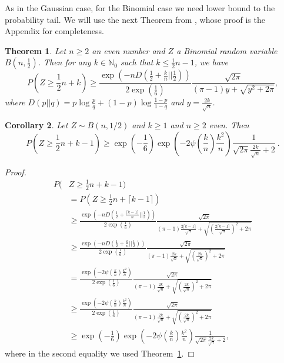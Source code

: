 \documentclass{article}
\newcommand{\field}[1]{\mathbb{#1}}
\newcommand{\Nat}{\field{N}}
\newtheorem{theorem}{Theorem}
\newtheorem{corrollary}[theorem]{Corollary}
\begin{document}
As in the Gaussian case, for the Binomial case we need lower bound to the probability tail.
We will use the next Theorem from \cite{nOrabona13}, whose proof is the Appendix for completeness.

\begin{theorem}
\label{lemma:bin}
Let $n\geq2$ an even number and $Z$ a Binomial random variable $B(n,\frac{1}{2})$. Then for any $k \in \Nat_0$ such that $k\leq \frac{1}{2}n-1$, we have
\[
P\left( Z \geq \frac{1}{2} n + k\right)
\geq  \frac{\exp\left(-n D(\frac{1}{2}+\frac{k}{n}||\frac{1}{2})\right)}{2 \exp\left(\frac{1}{6}\right)} \frac{\sqrt{2 \pi}}{(\pi-1)y+\sqrt{y^2+2 \pi}},
\]
where $D(p||q)=p \log \frac{p}{q}+(1-p) \log\frac{1-p}{1-q}$ and $y=\frac{2 k}{\sqrt{n}}$.
\end{theorem}
%
\begin{corrollary}
Let $Z \sim B(n, 1/2)$ and $k \geq 1$ and $n\geq2$ even. Then
\[
P(Z \geq \frac{1}{2} n + k-1) \geq \exp\left(-\frac{1}{6}\right) \exp\left(- 2 \psi\left(\frac{k}{n}\right) \frac{k^2}{n} \right) \frac{1}{\sqrt{2\pi} \frac{2 k}{\sqrt{n}} + 2 }~.
\]
\end{corrollary}
\begin{proof}
\begin{align*}
P(&Z \geq  \frac{1}{2} n + k-1) \\
& = P(Z\geq \frac{1}{2} n + \lceil k -1\rceil) \\
& \geq \frac{\exp\left(-n D(\frac{1}{2}+\frac{\lceil k -1\rceil}{n}||\frac{1}{2})\right)}{2 \exp\left(\frac{1}{6}\right)} \frac{\sqrt{2 \pi}}{(\pi-1)\frac{2\lceil k -1\rceil}{\sqrt{n}}+\sqrt{\left(\frac{2\lceil k -1\rceil}{\sqrt{n}}\right)^2+2 \pi}} \\
& \geq \frac{\exp\left(-n D(\frac{1}{2}+\frac{k}{n}||\frac{1}{2})\right)}{2 \exp\left(\frac{1}{6}\right)} \frac{\sqrt{2 \pi}}{(\pi-1)\frac{2k}{\sqrt{n}}+\sqrt{\left(\frac{2k}{\sqrt{n}}\right)^2+2 \pi}} \\
& = \frac{\exp\left(- 2 \psi(\frac{k}{n}) \frac{k^2}{n} \right)}{2 \exp\left(\frac{1}{6}\right)} \frac{\sqrt{2 \pi}}{(\pi-1)\frac{2k}{\sqrt{n}}+\sqrt{\left(\frac{2k}{\sqrt{n}}\right)^2+2 \pi}} \\
& \geq \frac{\exp\left(- 2 \psi(\frac{k}{n}) \frac{k^2}{n} \right)}{2 \exp\left(\frac{1}{6}\right)} \frac{\sqrt{2 \pi}}{(\pi-1)\frac{2k}{\sqrt{n}}+\sqrt{\left(\frac{2k}{\sqrt{n}}\right)^2+2 \pi}} \\
& \geq \exp\left(-\frac{1}{6}\right) \exp\left(- 2 \psi\left(\frac{k}{n}\right) \frac{k^2}{n} \right) \frac{1}{\sqrt{2\pi} \frac{2 k}{\sqrt{n}} + 2 },
\end{align*}
where in the second equality we used Theorem~\ref{lemma:bin}.
\end{proof}
\end{document}
